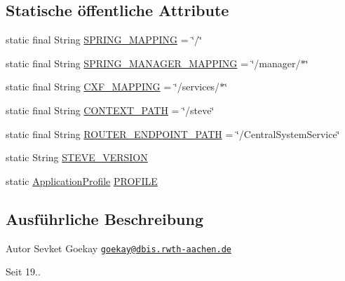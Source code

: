 \subsection*{Statische öffentliche Attribute}
\begin{DoxyCompactItemize}
\item 
static final String \hyperlink{classde_1_1rwth_1_1idsg_1_1steve_1_1_steve_configuration_aecc681bfa1ab888ae98352bfc28f7384}{S\-P\-R\-I\-N\-G\-\_\-\-M\-A\-P\-P\-I\-N\-G} = \char`\"{}/\char`\"{}
\item 
static final String \hyperlink{classde_1_1rwth_1_1idsg_1_1steve_1_1_steve_configuration_ae72ad42b30d59ffc90be207c36a85479}{S\-P\-R\-I\-N\-G\-\_\-\-M\-A\-N\-A\-G\-E\-R\-\_\-\-M\-A\-P\-P\-I\-N\-G} = \char`\"{}/manager/$\ast$\char`\"{}
\item 
static final String \hyperlink{classde_1_1rwth_1_1idsg_1_1steve_1_1_steve_configuration_ae158db01245b410e0e718a7408f5c3e5}{C\-X\-F\-\_\-\-M\-A\-P\-P\-I\-N\-G} = \char`\"{}/services/$\ast$\char`\"{}
\item 
static final String \hyperlink{classde_1_1rwth_1_1idsg_1_1steve_1_1_steve_configuration_a47f50a365d3a7d2b50e565b9add471e2}{C\-O\-N\-T\-E\-X\-T\-\_\-\-P\-A\-T\-H} = \char`\"{}/steve\char`\"{}
\item 
static final String \hyperlink{classde_1_1rwth_1_1idsg_1_1steve_1_1_steve_configuration_ad3eee289ead0984903f77d3266956543}{R\-O\-U\-T\-E\-R\-\_\-\-E\-N\-D\-P\-O\-I\-N\-T\-\_\-\-P\-A\-T\-H} = \char`\"{}/Central\-System\-Service\char`\"{}
\item 
static String \hyperlink{classde_1_1rwth_1_1idsg_1_1steve_1_1_steve_configuration_ab5b05aa586a942e62939aa9b25d4edf9}{S\-T\-E\-V\-E\-\_\-\-V\-E\-R\-S\-I\-O\-N}
\item 
static \hyperlink{enumde_1_1rwth_1_1idsg_1_1steve_1_1_application_profile}{Application\-Profile} \hyperlink{classde_1_1rwth_1_1idsg_1_1steve_1_1_steve_configuration_a193f0a1368c491f8035da36a133a97dd}{P\-R\-O\-F\-I\-L\-E}
\end{DoxyCompactItemize}


\subsection{Ausführliche Beschreibung}
\begin{DoxyAuthor}{Autor}
Sevket Goekay \href{mailto:goekay@dbis.rwth-aachen.de}{\tt goekay@dbis.\-rwth-\/aachen.\-de} 
\end{DoxyAuthor}
\begin{DoxySince}{Seit}
19.. 
\end{DoxySince}


